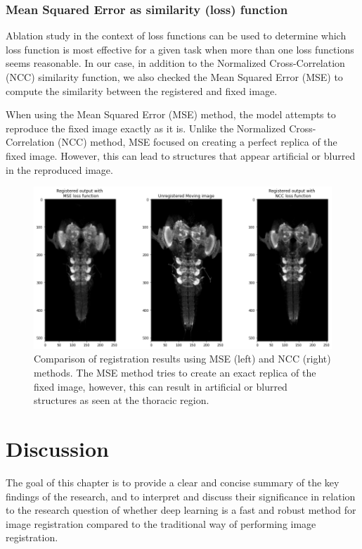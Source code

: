 \documentclass{book}
\begin{document}
	\subsection{Mean Squared Error as similarity (loss) function}
	Ablation study in the context of loss functions can be used to determine which loss function is most effective for a given task when more than one loss functions seems reasonable. In our case, in addition to the Normalized Cross-Correlation (NCC) similarity function, we also checked the Mean Squared Error (MSE) to compute the similarity between the registered and fixed image.
	
	When using the Mean Squared Error (MSE) method, the model attempts to reproduce the fixed image exactly as it is. Unlike the Normalized Cross-Correlation (NCC) method, MSE focused on creating a perfect replica of the fixed image. However, this can lead to structures that appear artificial or blurred in the reproduced image.
	
	\begin{figure}[h!]
		\centering
		\includegraphics[width=0.9\columnwidth]{resources/ablation_loss/ablation_loss.png}
		\caption{Comparison of registration results using MSE (left) and NCC (right) methods. The MSE method tries to create an exact replica of the fixed image, however, this can result in artificial or blurred structures as seen at the thoracic region.}
		\label{fig:ablation_loss}
	\end{figure}
		
	\chapter{Discussion}\label{chapter:discussion}
	The goal of this chapter is to provide a clear and concise summary of the key findings of the research, and to interpret and discuss their significance in relation to the research question of whether deep learning is a fast and robust method for image registration compared to the traditional way of performing image registration.
	
\end{document}
